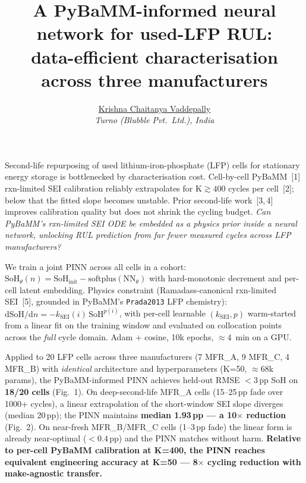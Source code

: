 \documentclass[12pt,a4paper]{article}
\title{\vspace{-1.0cm}\textbf{\normalsize A PyBaMM-informed neural network
for used-LFP RUL:\\ data-efficient characterisation across three manufacturers}}
\author{\normalsize \underline{Krishna Chaitanya Vaddepally}\\[-0.3em]
  \small \emph{Turno (Blubble Pvt.\ Ltd.), India}}
\date{}
\begin{document}
\maketitle
\thispagestyle{empty}

\vspace{-3.6em}
Second-life repurposing of used lithium-iron-phosphate (LFP) cells for
stationary energy storage is bottlenecked by characterisation cost.
Cell-by-cell PyBaMM~[1] rxn-limited SEI calibration reliably
extrapolates for K${\gtrsim}400$ cycles per cell~[2]; below that the
fitted slope becomes unstable. Prior second-life work~[3,\,4] improves
calibration quality but does not shrink the cycling budget. \emph{Can
PyBaMM's rxn-limited SEI ODE be embedded as a physics prior inside a
neural network, unlocking RUL prediction from far fewer measured
cycles across LFP manufacturers?}

We train a joint PINN across all cells in a cohort:
$\text{SoH}_\theta(n) = \text{SoH}_\text{init} -
\text{softplus}(\text{NN}_\theta)$ with hard-monotonic decrement and
per-cell latent embedding. Physics constraint (Ramadass-canonical
rxn-limited SEI~[5], grounded in PyBaMM's \texttt{Prada2013} LFP
chemistry): $\text{d}\text{SoH}/\text{d}n =
-k_\text{SEI}(i)\,\text{SoH}^{p(i)}$, with per-cell learnable
$(k_\text{SEI}, p)$ warm-started from a linear fit on the training
window and evaluated on collocation points across the \emph{full}
cycle domain. Adam + cosine, 10k epochs, ${\approx}4$~min on a GPU.

Applied to 20 LFP cells across three manufacturers (7 MFR\_A, 9
MFR\_C, 4 MFR\_B) with \emph{identical} architecture and
hyperparameters (K=50, ${\approx}68$k params), the PyBaMM-informed
PINN achieves held-out RMSE $<3$\,pp SoH on \textbf{18/20 cells}
(Fig.~1). On deep-second-life MFR\_A cells (15--25\,pp fade over
1000+ cycles), a linear extrapolation of the short-window SEI slope
diverges (median 20\,pp); the PINN maintains \textbf{median
1.93\,pp — a 10$\times$ reduction} (Fig.~2). On near-fresh
MFR\_B/MFR\_C cells (1--3\,pp fade) the linear form is already
near-optimal ($<0.4$\,pp) and the PINN matches without harm.
\textbf{Relative to per-cell PyBaMM calibration at K=400, the PINN
reaches equivalent engineering accuracy at K=50 — 8$\times$ cycling
reduction with make-agnostic transfer.}
\end{document}
